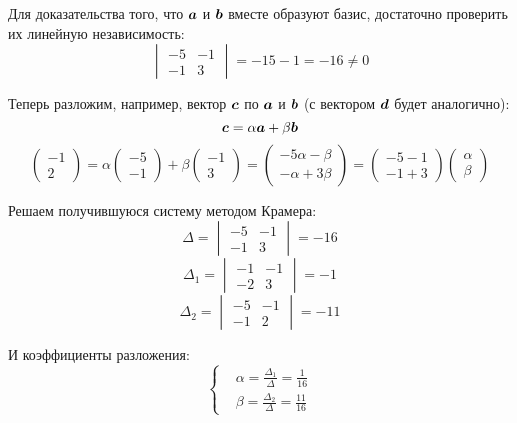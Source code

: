 \documentclass[a4paper,12pt]{article}
\begin{document}
  \begin{solution}
    Для доказательства того, что $\boldsymbol a$ и $\boldsymbol b$ вместе образуют базис, достаточно проверить их линейную независимость:
    \[
      \begin{vmatrix}
        -5 & -1\\
        -1 & 3
      \end{vmatrix}
      = -15 - 1
      = -16
      \not= 0
    \]
    
    Теперь разложим, например, вектор $\boldsymbol c$ по $\boldsymbol a$ и $\boldsymbol b$ (с вектором $\boldsymbol d$ будет аналогично):
    \[
      \boldsymbol c = \alpha \boldsymbol a + \beta \boldsymbol b
    \]
    \[
      \begin{pmatrix}
        -1 \\ 2
      \end{pmatrix}
      = \alpha \begin{pmatrix}
          -5 \\ -1
        \end{pmatrix}
        + \beta \begin{pmatrix}
          -1 \\ 3
        \end{pmatrix}
      = \begin{pmatrix}
          -5\alpha - \beta\\
          -\alpha + 3\beta
        \end{pmatrix}
      = \begin{pmatrix}
          -5 -1\\
          -1 + 3
        \end{pmatrix}
        \begin{pmatrix}
          \alpha \\ \beta
        \end{pmatrix}
    \]
    
    Решаем получившуюся систему методом Крамера:
    \[
      \Delta = \begin{vmatrix}
        -5 & -1\\
        -1 & 3
      \end{vmatrix} = -16
    \]
    \[
      \Delta_1 = \begin{vmatrix}
        -1 & -1\\
        -2 & 3
      \end{vmatrix} = -1
    \]
    \[
      \Delta_2 = \begin{vmatrix}
        -5 & -1\\
        -1 & 2
      \end{vmatrix} = -11
    \]
    
    И коэффициенты разложения:
    \[
      \left\{
        \begin{aligned}
          &\alpha = \frac{\Delta_1}{\Delta} = \frac{1}{16}\\
          &\beta = \frac{\Delta_2}{\Delta} = \frac{11}{16}
        \end{aligned}
      \right.
    \]
  \end{solution}
  
\end{document}
